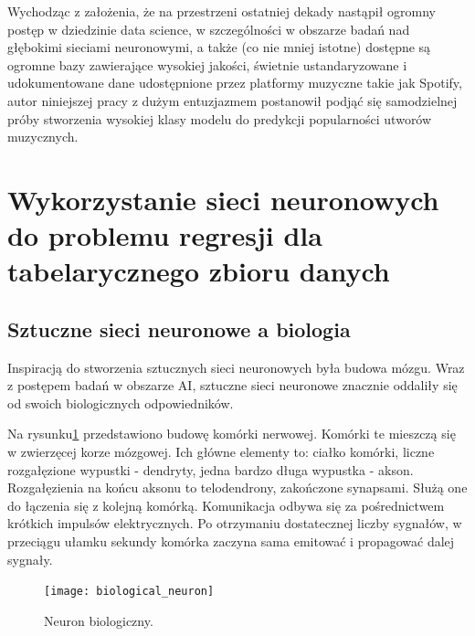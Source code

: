 \documentclass[a4paper,11pt]{article}
\begin{document}
    \bigskip

    Wychodząc z założenia, że na przestrzeni ostatniej dekady nastąpił ogromny postęp w dziedzinie data science, w szczególności w obszarze badań nad głębokimi sieciami neuronowymi, a także (co nie mniej istotne) dostępne są ogromne bazy zawierające wysokiej jakości, świetnie ustandaryzowane i udokumentowane dane udostępnione przez platformy muzyczne takie jak Spotify, autor niniejszej pracy z dużym entuzjazmem postanowił podjąć się samodzielnej próby stworzenia wysokiej klasy modelu do predykcji popularności utworów muzycznych.

    \newpage


    \section{Wykorzystanie sieci neuronowych do problemu regresji dla tabelarycznego zbioru danych}

    \subsection{Sztuczne sieci neuronowe a biologia}

    Inspiracją do stworzenia sztucznych sieci neuronowych była budowa mózgu. Wraz z postępem badań w obszarze AI, sztuczne sieci neuronowe znacznie oddaliły się od swoich biologicznych odpowiedników\cite{UczenieMaszynowe2018}.

    \bigskip

    Na rysunku\ref{fig:biological_neuron} przedstawiono budowę komórki nerwowej. Komórki te mieszczą się w zwierzęcej korze mózgowej. Ich główne elementy to: ciałko komórki, liczne rozgałęzione wypustki - dendryty, jedna bardzo długa wypustka - akson. Rozgałęzienia na końcu aksonu to telodendrony, zakończone synapsami. Służą one do łączenia się z kolejną komórką. Komunikacja odbywa się za pośrednictwem krótkich impulsów elektrycznych. Po otrzymaniu dostatecznej liczby sygnałów, w przeciągu ułamku sekundy komórka zaczyna sama emitować i propagować dalej sygnały\cite{UczenieMaszynowe2018}.

    \bigskip

    \begin{figure}[H]
        \label{fig:biological_neuron}
        \centering
        \texttt{[image: biological\_neuron]}
        \caption{Neuron biologiczny\cite{UczenieMaszynowe2018}.}
    \end{figure}

    \bigskip
\end{document}
